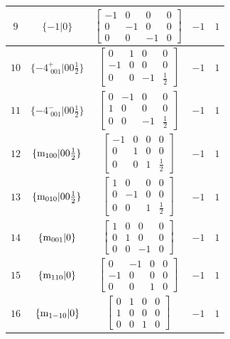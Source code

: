 \documentclass[fleqn,8pt]{jsarticle}
\begin{document}
\begin{longtable}{ccccc}
$ 9 $ & $ \{-1|0\} $ & $ \begin{bmatrix} -1 & 0 & 0 & 0 \\ 0 & -1 & 0 & 0 \\ 0 & 0 & -1 & 0 \end{bmatrix} $ & $ -1 $ & $ 1 $ \\ \hline
$ 10 $ & $ \{-4^{+}_{\,\,001}|0 0 \frac{1}{2}\} $ & $ \begin{bmatrix} 0 & 1 & 0 & 0 \\ -1 & 0 & 0 & 0 \\ 0 & 0 & -1 & \frac{1}{2} \end{bmatrix} $ & $ -1 $ & $ 1 $ \\ \hline
$ 11 $ & $ \{-4^{-}_{\,\,001}|0 0 \frac{1}{2}\} $ & $ \begin{bmatrix} 0 & -1 & 0 & 0 \\ 1 & 0 & 0 & 0 \\ 0 & 0 & -1 & \frac{1}{2} \end{bmatrix} $ & $ -1 $ & $ 1 $ \\ \hline
$ 12 $ & $ \{{\rm m}_{100}|0 0 \frac{1}{2}\} $ & $ \begin{bmatrix} -1 & 0 & 0 & 0 \\ 0 & 1 & 0 & 0 \\ 0 & 0 & 1 & \frac{1}{2} \end{bmatrix} $ & $ -1 $ & $ 1 $ \\ \hline
$ 13 $ & $ \{{\rm m}_{010}|0 0 \frac{1}{2}\} $ & $ \begin{bmatrix} 1 & 0 & 0 & 0 \\ 0 & -1 & 0 & 0 \\ 0 & 0 & 1 & \frac{1}{2} \end{bmatrix} $ & $ -1 $ & $ 1 $ \\ \hline
$ 14 $ & $ \{{\rm m}_{001}|0\} $ & $ \begin{bmatrix} 1 & 0 & 0 & 0 \\ 0 & 1 & 0 & 0 \\ 0 & 0 & -1 & 0 \end{bmatrix} $ & $ -1 $ & $ 1 $ \\ \hline
$ 15 $ & $ \{{\rm m}_{110}|0\} $ & $ \begin{bmatrix} 0 & -1 & 0 & 0 \\ -1 & 0 & 0 & 0 \\ 0 & 0 & 1 & 0 \end{bmatrix} $ & $ -1 $ & $ 1 $ \\ \hline
$ 16 $ & $ \{{\rm m}_{1-10}|0\} $ & $ \begin{bmatrix} 0 & 1 & 0 & 0 \\ 1 & 0 & 0 & 0 \\ 0 & 0 & 1 & 0 \end{bmatrix} $ & $ -1 $ & $ 1 $ \\ \hline

\end{longtable}
\end{document}
